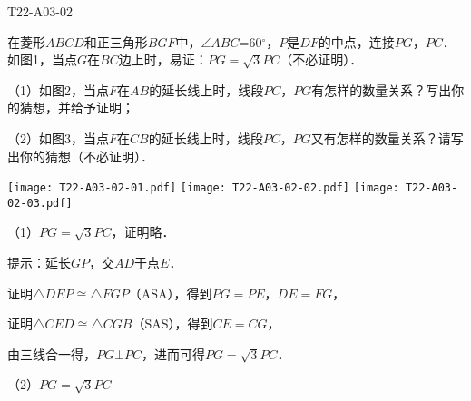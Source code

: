 \begin{defproblem}{T22-A03-02}%
\begin{onlyproblem}%
在菱形$ABCD$和正三角形$BGF$中，$\angle $$ABC$=60$^{\circ }$，$P$是$DF$的中点，连接$PG$，$PC$．如图1，当点$G$在$BC$边上时，易证：$PG=\sqrt 3 PC$（不必证明）．

（1）如图2，当点$F$在$AB$的延长线上时，线段$PC$，$PG$有怎样的数量关系？写出你的猜想，并给予证明；

（2）如图3，当点$F$在$CB$的延长线上时，线段$PC$，$PG$又有怎样的数量关系？请写出你的猜想（不必证明）．


\begin{center}
\texttt{[image: T22-A03-02-01.pdf]}\qquad
\texttt{[image: T22-A03-02-02.pdf]}\qquad
\texttt{[image: T22-A03-02-03.pdf]}
\end{center}



\end{onlyproblem}%
\begin{onlysolution}%
（1）$P G=\sqrt{3} P C$，证明略．

提示：延长$GP$，交$AD$于点$E$．

证明$\triangle DEP\cong \triangle FGP$（ASA），得到$PG=PE$，$DE=FG$，

证明$\triangle CED\cong\triangle CGB$（SAS），得到$CE=CG$，

由三线合一得，$PG \bot PC$，进而可得$P G=\sqrt{3} P C$．

（2）$P G=\sqrt{3} P C$

\begin{center}
\end{center}
\end{onlysolution}%
\end{defproblem}



